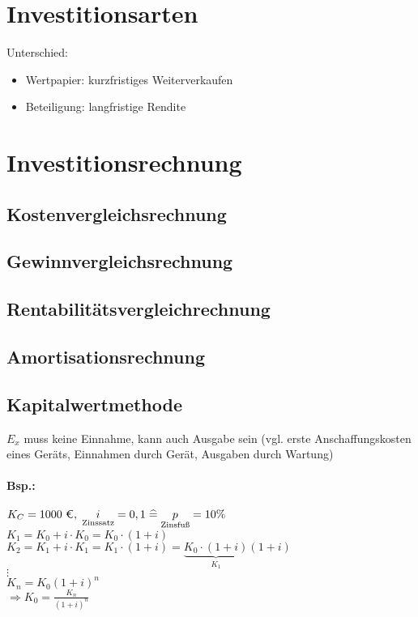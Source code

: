 \section{Investitionsarten}
Unterschied:
\begin{itemize}
\item Wertpapier: kurzfristiges Weiterverkaufen
\item Beteiligung: langfristige Rendite
\end{itemize}

\section{Investitionsrechnung}
\subsection{Kostenvergleichsrechnung}
\subsection{Gewinnvergleichsrechnung}

\subsection{Rentabilitätsvergleichrechnung}

\subsection{Amortisationsrechnung}

\subsection{Kapitalwertmethode}
$E_x$ muss keine Einnahme, kann auch Ausgabe sein (vgl. erste Anschaffungskosten eines Geräts, Einnahmen durch Gerät, Ausgaben durch Wartung)
\paragraph{Bsp.:}\parskp
$K_C=1000 \text{ \euro{}}, \; \underset{\text{Zinssatz}}{i}=0,1\corr \underset{\text{Zinsfuß}}{p}=10\%$\\
$K_1=K_0+i\cdot K_0=K_0\cdot(1+i)$\\
$K_2=K_1+i\cdot K_1=K_1\cdot (1+i)=\underbrace{K_0\cdot (1+i)}_{K_1}(1+i)$\\
$\vdots$\\
$K_n=K_0(1+i)^n$\\
$\Rightarrow K_0 = \frac{K_n}{(1+i)^n}$

